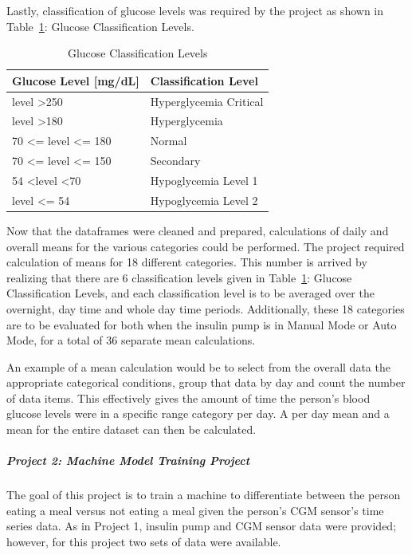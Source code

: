 Lastly, classification of glucose levels was required by the project as shown in Table~\ref{CSE572_Table_1}: Glucose Classification Levels.

\begin{table}
\centering
\caption[]{Glucose Classification Levels}
\label{CSE572_Table_1}
\begin{tabular}{p{}p{}}
\toprule
Glucose Level [mg/dL] & Classification Level \\
\hline
level \textgreater  250 & Hyperglycemia Critical \\
level \textgreater  180 & Hyperglycemia \\
70 \textless = level \textless = 180 & Normal \\
70 \textless = level \textless = 150 & Secondary \\
54 \textless  level \textless  70 & Hypoglycemia Level 1 \\
level \textless = 54 & Hypoglycemia Level 2 \\
\bottomrule
\end{tabular}
\end{table}

Now that the dataframes were cleaned and prepared, calculations of daily and overall means for the various categories could be performed.  The project required calculation of means for 18 different categories.  This number is arrived by realizing that there are 6 classification levels given in Table~\ref{CSE572_Table_1}: Glucose Classification Levels, and each classification level is to be averaged over the overnight, day time and whole day time periods.  Additionally, these 18 categories are to be evaluated for both when the insulin pump is in Manual Mode or Auto Mode, for a total of 36 separate mean calculations.

An example of a mean calculation would be to select from the overall data the appropriate categorical conditions, group that data by day and count the number of data items.  This effectively gives the amount of time the person's blood glucose levels were in a specific range category per day.  A per day mean and a mean for the entire dataset can then be calculated.

\subparagraph{Project 2: Machine Model Training Project}

The goal of this project is to train a machine to differentiate between the person eating a meal versus not eating a meal given the person's CGM sensor's time series data.  As in Project 1, insulin pump and CGM sensor data were provided; however, for this project two sets of data were available.

